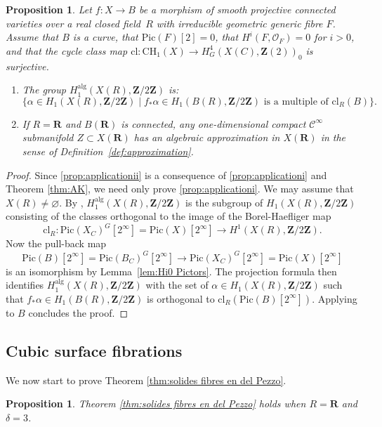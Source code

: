 \documentclass[JEP,XML,SOM,Unicode]{cedram}
\theoremstyle{plain}
\newtheorem{prop}[thm]{Proposition}
\theoremstyle{definition}
\numberwithin{equation}{section}
\newcommand{\alg}{{\mathrm{alg}}}
\newcommand{\cl}{{\mathrm{cl}}}
\newcommand{\sO}{{\mathscr O}}
\newcommand{\R}{{\mathbf R}}
\newcommand{\Z}{{\mathbf Z}}
\newcommand{\CH}{\mathrm{CH}}
\newcommand{\Pic}{\mathrm{Pic}}
\newcommand{\ci}{\mathscr{C}^{\infty}}
\begin{document}
\begin{prop}
\label{prop:application of ihc for dp fibration}
Let $f:X\to B$ be a morphism of smooth projective connected varieties over a real closed field~$R$ with irreducible geometric generic fibre $F$.
Assume that $B$ is a curve, that $\Pic(F)[2]=0$, that $H^i(F,\sO_F)=0$ for $i>0$,
and that the cycle class map $\cl:\CH_1(X)\to H^4_G(X(C),\Z(2))_0$ is surjective.
\begin{enumerate}
\item\label{prop:applicationi}
The group $H_1^{\alg}(X(R),\Z/2\Z)$ is:
\[
\{\alpha\in H_1(X(R),\Z/2\Z)\mid f_*\alpha\in H_1(B(R),\Z/2\Z)\textrm{ is a multiple of }\cl_{R}(B) \}.
\]
\item\label{prop:applicationii}
If $R=\R$ and $B(\R)$ is connected, any one-dimensional compact $\ci$ submanifold $Z\subset X(\R)$ has an algebraic approximation in $X(\R)$ in the sense of Definition~\ref{def:approximation}.
\end{enumerate}
\end{prop}

\begin{proof}
Since \eqref{prop:applicationii} is a consequence of \eqref{prop:applicationi} and Theorem \ref{thm:AK}, we need only prove \eqref{prop:applicationi}.
We may assume that $X(R)\neq\varnothing$.
By \cite[Th.\,\ref*{BW1-th:image psi} and~\ref*{BW1-th:phi}]{BW1}, $H_1^{\alg}(X(R),\Z/2\Z)$ is the subgroup of $H_1(X(R),\Z/2\Z)$ consisting of the classes orthogonal to the image of the Borel-Haefliger map
\[
\cl_{R}:\Pic(X_C)^G[2^{\infty}]=\Pic(X)[2^\infty]\to H^1(X(R),\Z/2\Z).
\]
Now the pull-back map
\[
\Pic(B)[2^\infty]=\Pic(B_C)^G[2^{\infty}]\to \Pic(X_C)^G[2^{\infty}]=\Pic(X)[2^\infty]
\]
is an isomorphism by Lemma~\ref{lem:Hi0 Pictors}.
The projection formula \cite[(\ref*{BW1-eq:projection formula})]{BW1}
then identifies $H_1^{\alg}(X(R),\Z/2\Z)$ with the set of $\alpha\in H_1(X(R),\Z/2\Z)$ such that $f_*\alpha\in H_1(B(R),\Z/2\Z)$ is orthogonal to $\cl_{R}(\Pic(B)[2^{\infty}])$.
Applying \cite[Th.\,\ref*{BW1-th:image psi}]{BW1} to $B$ concludes the proof.
\end{proof}

\subsection{Cubic surface fibrations}
\label{subsec:cubicfibrations}
We now start to prove Theorem \ref{thm:solides fibres en del Pezzo}.

\begin{prop}
\label{prop:cubicsurfacefibrations}
Theorem \ref{thm:solides fibres en del Pezzo} holds when $R=\R$ and $\delta=3$.
\end{prop}
\end{document}

